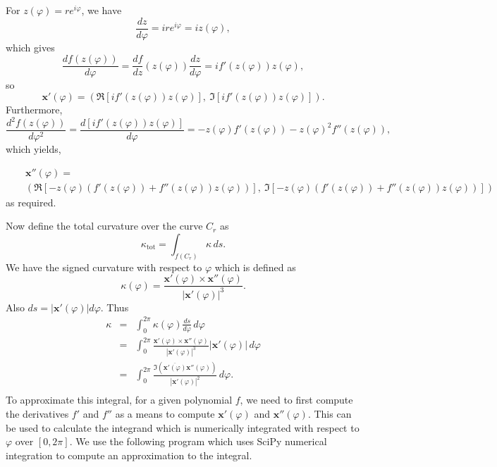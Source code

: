 \documentclass{article}
\begin{document}
For \(z(\varphi) = re^{i\varphi}\), we have
\[ \frac{dz}{d\varphi} = ire^{i\varphi} = iz(\varphi), \]
which gives
\[ \frac{df(z(\varphi))}{d\varphi} = \frac{df}{dz}(z(\varphi))\frac{dz}{d\varphi} = if'(z(\varphi))z(\varphi), \]
so
\[ \mathbf{x}'(\varphi) = \left( \Re[if'(z(\varphi))z(\varphi)], \ \Im[if'(z(\varphi))z(\varphi)] \right). \]
Furthermore,
\[ \frac{d^2f(z(\varphi))}{d\varphi^2} = \frac{d[if'(z(\varphi))z(\varphi)]}{d\varphi} = -z(\varphi) f'(z(\varphi)) - z(\varphi)^2f''(z(\varphi)), \]
which yields,

\begin{eqnarray*}
    &&\mathbf{x}''(\varphi) =\\
    && \left( \Re[-z(\varphi) (f'(z(\varphi)) + f''(z(\varphi))z(\varphi))], \ \Im[-z(\varphi) (f'(z(\varphi)) + f''(z(\varphi))z(\varphi))] \right)
\end{eqnarray*}
as required. 


Now define the total curvature over the curve \(C_r\) as
\[ \kappa_{\mathrm{tot}} = \int_{f(C_r)} \kappa \,ds. \]
We have the signed curvature with respect to \(\varphi\) which is defined as
\[ \kappa(\varphi) = \frac{\mathbf{x}'(\varphi) \times \mathbf{x}''(\varphi)}{|\mathbf{x}'(\varphi)|^3}. \]
Also \(ds = |\mathbf{x}'(\varphi)|d\varphi\). Thus
\begin{eqnarray*}
    \kappa & = & \int_0^{2\pi} \kappa(\varphi) \frac{ds}{d\varphi}\,d\varphi \\
           & = & \int_0^{2\pi} \frac{\mathbf{x}'(\varphi) \times \mathbf{x}''(\varphi)}{|\mathbf{x}'(\varphi)|^3} |\mathbf{x}'(\varphi)|\,d\varphi \\
           & = & \int_0^{2\pi} \frac{\Im(\overline{\mathbf{x}'(\varphi)}\mathbf{x}''(\varphi))}{|\mathbf{x}'(\varphi)|^2} \,d\varphi. \\
\end{eqnarray*}
To approximate this integral, for a given polynomial \(f\), we need to first compute the derivatives \(f'\) and \(f''\) as a means to compute \(\mathbf{x}'(\varphi)\) and \(\mathbf{x}''(\varphi)\). This can be used to calculate the integrand which is numerically integrated with respect to \(\varphi\) over \([0, 2\pi]\). We use the following program which uses SciPy numerical integration to compute an approximation to the integral.
\end{document}
